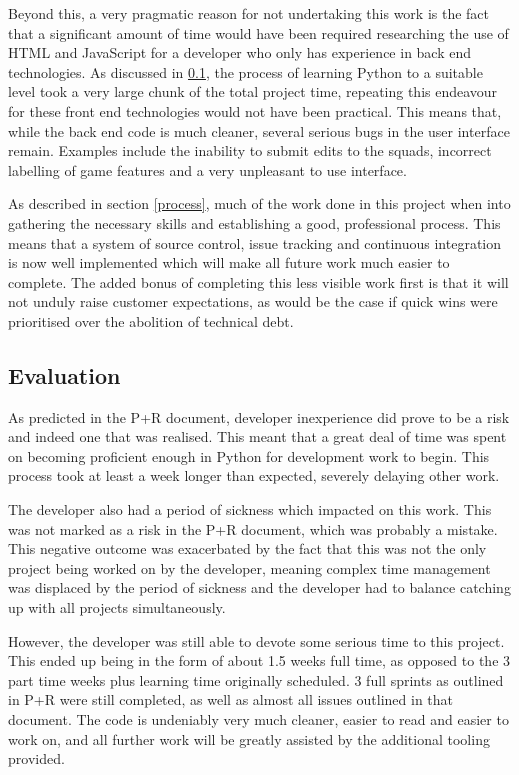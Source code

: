 \documentclass[a4paper,12pt]{article}
\begin{document}
Beyond this, a very pragmatic reason for not undertaking this work is the fact that a significant amount of time would have been required researching the use of HTML and JavaScript for a developer who only has experience in back end technologies. As discussed in \ref{eval}, the process of learning Python to a suitable level took a very large chunk of the total project time, repeating this endeavour for these front end technologies would not have been practical. This means that, while the back end code is much cleaner, several serious bugs in the user interface remain. Examples include the inability to submit edits to the squads, incorrect labelling of game features and a very unpleasant to use interface.

As described in section \ref{process}, much of the work done in this project when into gathering the necessary skills and establishing a good, professional process. This means that a system of source control, issue tracking and continuous integration is now well implemented which will make all future work much easier to complete. The added bonus of completing this less visible work first is that it will not unduly raise customer expectations, as would be the case if quick wins were prioritised over the abolition of technical debt.

\subsection{Evaluation}
\label{eval}

As predicted in the P+R document, developer inexperience did prove to be a risk and indeed one that was realised. This meant that a great deal of time was spent on becoming proficient enough in Python for development work to begin. This process took at least a week longer than expected, severely delaying other work.

The developer also had a period of sickness which impacted on this work. This was not marked as a risk in the P+R document, which was probably a mistake. This negative outcome was exacerbated by the fact that this was not the only project being worked on by the developer, meaning complex time management was displaced by the period of sickness and the developer had to balance catching up with all projects simultaneously.

However, the developer was still able to devote some serious time to this project. This ended up being in the form of about 1.5 weeks full time, as opposed to the 3 part time weeks plus learning time originally scheduled. 3 full sprints as outlined in P+R were still completed, as well as almost all issues outlined in that document. The code is undeniably very much cleaner, easier to read and easier to work on, and all further work will be greatly assisted by the additional tooling provided.
\end{document}

